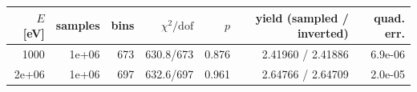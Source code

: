 \begin{tabular}{rrrrrrr}
\toprule
$E$ [eV] & samples & bins & $\chi^2/\mathrm{dof}$ & $p$ & yield (sampled / inverted) & quad. err. \\
\midrule
1000 & 1e+06 & 673 & 630.8/673 & 0.876 & 2.41960 / 2.41886 & 6.9e-06 \\
2e+06 & 1e+06 & 697 & 632.6/697 & 0.961 & 2.64766 / 2.64709 & 2.0e-05 \\
\bottomrule
\end{tabular}
